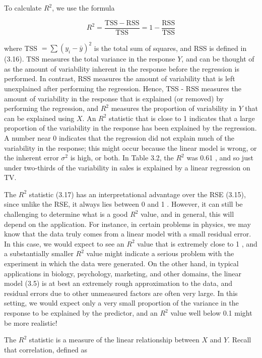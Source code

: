 \documentclass[10pt]{article}
\begin{document}
To calculate $R^{2}$, we use the formula


\begin{equation*}
R^{2}=\frac{\mathrm{TSS}-\mathrm{RSS}}{\mathrm{TSS}}=1-\frac{\mathrm{RSS}}{\mathrm{TSS}} \tag{3.17}
\end{equation*}


where TSS $=\sum\left(y_{i}-\bar{y}\right)^{2}$ is the total sum of squares, and RSS is defined in (3.16). TSS measures the total variance in the response $Y$, and can be thought of as the amount of variability inherent in the response before the regression is performed. In contrast, RSS measures the amount of variability that is left unexplained after performing the regression. Hence, TSS - RSS measures the amount of variability in the response that is explained (or removed) by performing the regression, and $R^{2}$ measures the proportion of variability in $Y$ that can be explained using $X$. An $R^{2}$ statistic that is close to 1 indicates that a large proportion of the variability in the response has been explained by the regression. A number near 0 indicates that the regression did not explain much of the variability in the response; this might occur because the linear model is wrong, or the inherent error $\sigma^{2}$ is high, or both. In Table 3.2, the $R^{2}$ was 0.61 , and so just under two-thirds of the variability in sales is explained by a linear regression on TV.

The $R^{2}$ statistic (3.17) has an interpretational advantage over the RSE (3.15), since unlike the RSE, it always lies between 0 and 1 . However, it can still be challenging to determine what is a good $R^{2}$ value, and in general, this will depend on the application. For instance, in certain problems in physics, we may know that the data truly comes from a linear model with a small residual error. In this case, we would expect to see an $R^{2}$ value that is extremely close to 1 , and a substantially smaller $R^{2}$ value might indicate a serious problem with the experiment in which the data were generated. On the other hand, in typical applications in biology, psychology, marketing, and other domains, the linear model (3.5) is at best an extremely rough approximation to the data, and residual errors due to other unmeasured factors are often very large. In this setting, we would expect only a very small proportion of the variance in the response to be explained by the predictor, and an $R^{2}$ value well below 0.1 might be more realistic!

The $R^{2}$ statistic is a measure of the linear relationship between $X$ and $Y$. Recall that correlation, defined as
\end{document}
